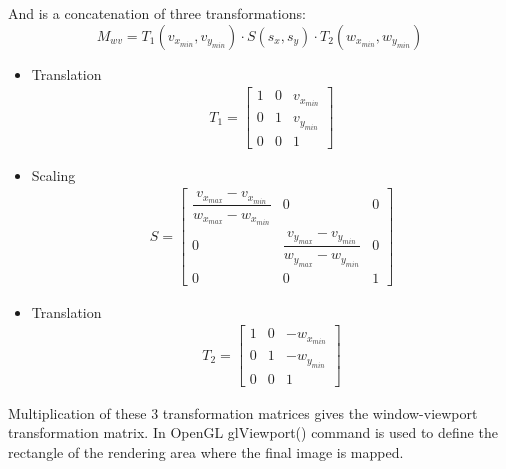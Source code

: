 And is a concatenation of three transformations:
$$
M_{wv} = T_{1}(v_{x_{min}},v_{y_{min}}) \cdot S(s_x, s_y) \cdot T_{2}(w_{x_{min}}, w_{y_{min}})
$$
\begin{itemize}
	\item Translation
		\begin{align*}
		T_{1} =
      \begin{bmatrix}
          1 & 0 & v_{x_{min}} \\
          0 & 1 & v_{y_{min}} \\
          0 & 0 & 1
      \end{bmatrix} 
		\end{align*}
	\item Scaling
		\begin{align*}
    	S =
      \begin{bmatrix}
          \dfrac{v_{x_{max}} - v_{x_{min}}}{w_{x_{max}} - w_{x_{min}}} & 0 & 0 \\
          0 & \dfrac{v_{y_{max}} - v_{y_{min}}}{w_{y_{max}} - w_{y_{min}}} &  0 \\
          0 & 0 & 1
      \end{bmatrix} 
		\end{align*}
	\item Translation
		\begin{align*}
    	T_{2} =
      \begin{bmatrix}
          1 & 0 & -w_{x_{min}} \\
          0 & 1 & -w_{y_{min}} \\
          0 & 0 & 1
        \end{bmatrix} 
		\end{align*}
\end{itemize}
Multiplication of these 3 transformation matrices gives the window-viewport transformation matrix.
In OpenGL glViewport() command is used to define the rectangle of the rendering area where the
final image is mapped.
\clearpage

